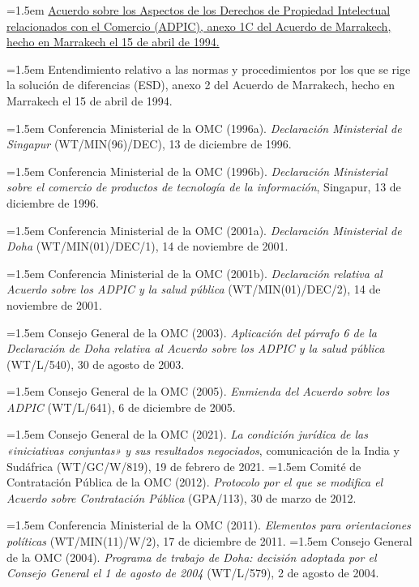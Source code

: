 \documentclass[10pt,a4paper]{article}
\newcounter{anexo}
\begin{document}
\noindent\hangindent=1.5em \href{https://www.wto.org/spanish/docs_s/legal_s/27-trips_01_s.htm}{Acuerdo sobre los Aspectos de los Derechos de Propiedad Intelectual relacionados con el Comercio (ADPIC), anexo 1C del Acuerdo de Marrakech, hecho en Marrakech el 15 de abril de 1994.}

\noindent\hangindent=1.5em Entendimiento relativo a las normas y procedimientos por los que se rige la solución de diferencias (ESD), anexo 2 del Acuerdo de Marrakech, hecho en Marrakech el 15 de abril de 1994.

\noindent\hangindent=1.5em Conferencia Ministerial de la OMC (1996a). \textit{Declaración Ministerial de Singapur} (WT/MIN(96)/DEC), 13 de diciembre de 1996.

\noindent\hangindent=1.5em Conferencia Ministerial de la OMC (1996b). \textit{Declaración Ministerial sobre el comercio de productos de tecnología de la información}, Singapur, 13 de diciembre de 1996.

\noindent\hangindent=1.5em Conferencia Ministerial de la OMC (2001a). \textit{Declaración Ministerial de Doha} (WT/MIN(01)/DEC/1), 14 de noviembre de 2001.

\noindent\hangindent=1.5em Conferencia Ministerial de la OMC (2001b). \textit{Declaración relativa al Acuerdo sobre los ADPIC y la salud pública} (WT/MIN(01)/DEC/2), 14 de noviembre de 2001.

\noindent\hangindent=1.5em Consejo General de la OMC (2003). \textit{Aplicación del párrafo 6 de la Declaración de Doha relativa al Acuerdo sobre los ADPIC y la salud pública} (WT/L/540), 30 de agosto de 2003.

\noindent\hangindent=1.5em Consejo General de la OMC (2005). \textit{Enmienda del Acuerdo sobre los ADPIC} (WT/L/641), 6 de diciembre de 2005.

\noindent\hangindent=1.5em Consejo General de la OMC (2021). \textit{La condición jurídica de las «iniciativas conjuntas» y sus resultados negociados}, comunicación de la India y Sudáfrica (WT/GC/W/819), 19 de febrero de 2021.
\noindent\hangindent=1.5em Comité de Contratación Pública de la OMC (2012). \textit{Protocolo por el que se modifica el Acuerdo sobre Contratación Pública} (GPA/113), 30 de marzo de 2012.

\noindent\hangindent=1.5em Conferencia Ministerial de la OMC (2011). \textit{Elementos para orientaciones políticas} (WT/MIN(11)/W/2), 17 de diciembre de 2011.
\noindent\hangindent=1.5em Consejo General de la OMC (2004). \textit{Programa de trabajo de Doha: decisión adoptada por el Consejo General el 1 de agosto de 2004} (WT/L/579), 2 de agosto de 2004.
\end{document}
